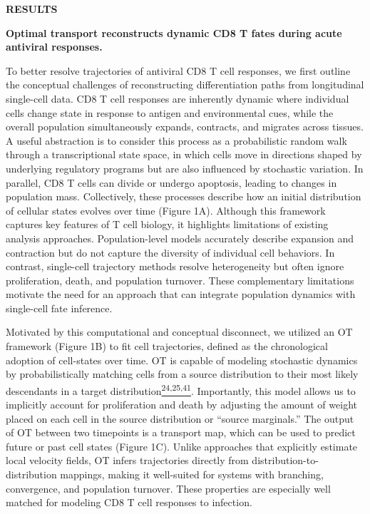 \textbf{RESULTS}

\textbf{Optimal transport reconstructs dynamic CD8 T fates during acute
antiviral responses. }

To better resolve trajectories of antiviral CD8 T cell responses, we
first outline the conceptual challenges of reconstructing
differentiation paths from longitudinal single-cell data. CD8 T cell
responses are inherently dynamic where individual cells change state in
response to antigen and environmental cues, while the overall population
simultaneously expands, contracts, and migrates across tissues. A useful
abstraction is to consider this process as a probabilistic random walk
through a transcriptional state space, in which cells move in directions
shaped by underlying regulatory programs but are also influenced by
stochastic variation. In parallel, CD8 T cells can divide or undergo
apoptosis, leading to changes in population mass. Collectively, these
processes describe how an initial distribution of cellular states
evolves over time (Figure 1A). Although this framework captures key
features of T cell biology, it highlights limitations of existing
analysis approaches. Population-level models accurately describe
expansion and contraction but do not capture the diversity of individual
cell behaviors. In contrast, single-cell trajectory methods resolve
heterogeneity but often ignore proliferation, death, and population
turnover. These complementary limitations motivate the need for an
approach that can integrate population dynamics with single-cell fate
inference.

Motivated by this computational and conceptual disconnect, we utilized
an OT framework (Figure 1B) to fit cell trajectories, defined as the
chronological adoption of cell-states over time. OT is capable of
modeling stochastic dynamics by probabilistically matching cells from a
source distribution to their most likely descendants in a target
distribution\href{https://sciwheel.com/work/citation?ids=15548348,18537396,6347423\&pre=\&pre=\&pre=\&suf=\&suf=\&suf=\&sa=0,0,0\&dbf=0\&dbf=0\&dbf=0}{\textsuperscript{24,25,41}}.
Importantly, this model allows us to implicitly account for
proliferation and death by adjusting the amount of weight placed on each
cell in the source distribution or ``source marginals.'' The output of
OT between two timepoints is a transport map, which can be used to
predict future or past cell states (Figure 1C). Unlike approaches that
explicitly estimate local velocity fields, OT infers trajectories
directly from distribution-to-distribution mappings, making it
well-suited for systems with branching, convergence, and population
turnover. These properties are especially well matched for modeling CD8
T cell responses to infection.

